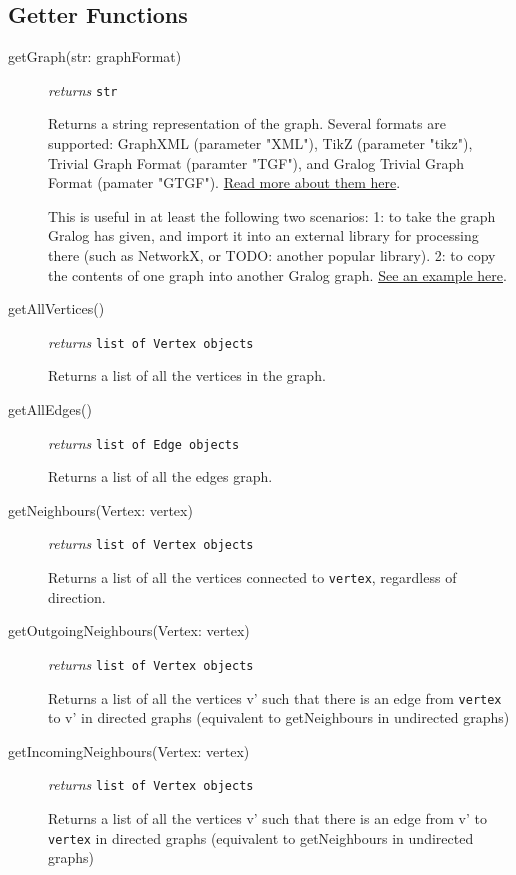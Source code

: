 \documentclass{article}
\newcounter{example}
\newlength\q
\begin{document}
\subsection{Getter Functions}
\begin{description}
\item[getGraph(str: graphFormat)]\emph{returns}
  \texttt{str}

Returns a string representation of the graph. Several formats are supported: GraphXML (parameter "XML"), TikZ (parameter "tikz"), Trivial Graph Format (paramter "TGF"), and Gralog Trivial Graph Format (pamater "GTGF"). \hyperref[graphFormatsInDetail]{Read more about them here}.

This is useful in at least the following two scenarios: 1: to take the graph Gralog has given, and import it into an external library for processing there (such as NetworkX, or TODO: another popular library). 2: to copy the contents of one graph into another Gralog graph. \hyperref[getGraphExample]{See an example here}.


\item[getAllVertices()]\emph{returns}
  \texttt{list of Vertex objects}

Returns a list of all the vertices in the graph.

\item[getAllEdges()]\emph{returns}
  \texttt{list of Edge objects}

Returns a list of all the edges graph.

\item[getNeighbours(Vertex: vertex)]\emph{returns}
  \texttt{list of Vertex objects}

Returns a list of all the vertices connected to \texttt{vertex}, regardless of direction.

\item[getOutgoingNeighbours(Vertex: vertex)]\emph{returns}
  \texttt{list of Vertex objects}

Returns a list of all the vertices v' such that there is an edge from \texttt{vertex} to v' in directed graphs (equivalent to getNeighbours in undirected graphs)

\item[getIncomingNeighbours(Vertex: vertex)]\emph{returns}
  \texttt{list of Vertex objects}

Returns a list of all the vertices v' such that there is an edge from v' to \texttt{vertex} in directed graphs (equivalent to getNeighbours in undirected graphs)


\end{description}
\end{document}
